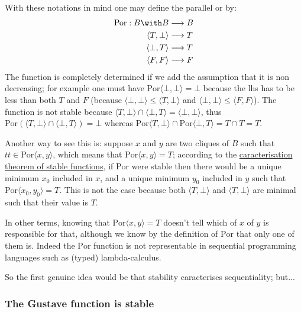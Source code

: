 With these notations in mind one may define the parallel or by:
\begin{align*}
\mathrm{Por} : B\with B & \longrightarrow  B\\
  \langle T,\bot\rangle & \longrightarrow  T\\
  \langle \bot,T\rangle & \longrightarrow  T\\
    \langle F, F\rangle & \longrightarrow  F
\end{align*}
The function is completely determined if we add the assumption that it
is non decreasing; for example one must have
\(\mathrm{Por}\langle\bot,\bot\rangle = \bot\) because the lhs has to be
less than both \(T\) and \(F\) (because
\(\langle\bot,\bot\rangle \leq \langle T,\bot\rangle\) and
\(\langle\bot,\bot\rangle \leq \langle F,F\rangle\)).
The function is not stable because
\(\langle T,\bot\rangle \cap \langle \bot, T\rangle = \langle\bot, \bot\rangle\),
thus
\(\mathrm{Por}(\langle T,\bot\rangle \cap \langle \bot, T\rangle) = \bot\)
whereas
\(\mathrm{Por}\langle T,\bot\rangle \cap \mathrm{Por}\langle \bot, T\rangle = T\cap T = T\).

Another way to see this is: suppose \(x\) and \(y\) are two cliques of
\(B\) such that \(tt\in \mathrm{Por}\langle x, y\rangle\), which means
that \(\mathrm{Por}\langle x, y\rangle = T\); according to the
\hyperref[stable-functions]{caracterisation theorem of stable
functions}, if \(\mathrm{Por}\) were stable then there would be a unique
minimum \(x_0\) included in \(x\), and a unique minimum \(y_0\) included
in \(y\) such that \(\mathrm{Por}\langle x_0, y_0\rangle = T\). This is
not the case because both \(\langle T,\bot\rangle\) and
\(\langle T,\bot\rangle\) are minimal such that their value is \(T\).

In other terms, knowing that \(\mathrm{Por}\langle x, y\rangle = T\)
doesn't tell which of \(x\) of \(y\) is responsible for that, although
we know by the definition of \(\mathrm{Por}\) that only one of them is.
Indeed the \(\mathrm{Por}\) function is not representable in sequential
programming languages such as (typed) lambda-calculus.

So the first genuine idea would be that stability caracterises
sequentiality; but...

\subsubsection{The Gustave function is stable}\label{the-gustave-function-is-stable}


